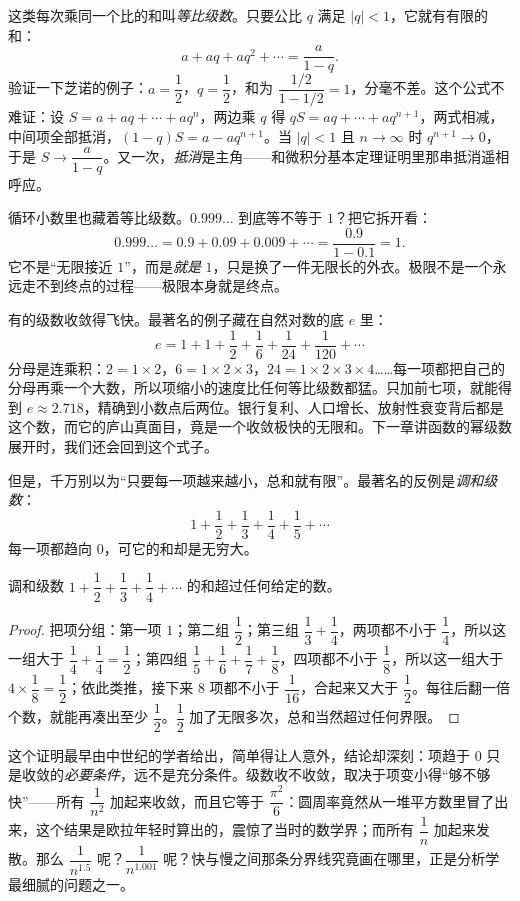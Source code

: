 这类每次乘同一个比的和叫\emph{等比级数}。只要公比 $q$ 满足 $|q|<1$，它就有有限的和：
\[
a+aq+aq^{2}+\cdots=\frac{a}{1-q}.
\]
验证一下芝诺的例子：$a=\dfrac12$，$q=\dfrac12$，和为 $\dfrac{1/2}{1-1/2}=1$，分毫不差。这个公式不难证：设 $S=a+aq+\cdots+aq^{n}$，两边乘 $q$ 得 $qS=aq+\cdots+aq^{n+1}$，两式相减，中间项全部抵消，$(1-q)S=a-aq^{n+1}$。当 $|q|<1$ 且 $n\to\infty$ 时 $q^{n+1}\to 0$，于是 $S\to\dfrac{a}{1-q}$。又一次，\emph{抵消}是主角——和微积分基本定理证明里那串抵消遥相呼应。

循环小数里也藏着等比级数。$0.999\ldots$ 到底等不等于 $1$？把它拆开看：
\[
0.999\ldots=0.9+0.09+0.009+\cdots=\frac{0.9}{1-0.1}=1 .
\]
它不是“无限接近 $1$”，而是\emph{就是} $1$，只是换了一件无限长的外衣。极限不是一个永远走不到终点的过程——极限本身就是终点。

有的级数收敛得飞快。最著名的例子藏在自然对数的底 $e$ 里：
\[
e=1+1+\frac12+\frac16+\frac1{24}+\frac1{120}+\cdots
\]
分母是连乘积：$2=1\times2$，$6=1\times2\times3$，$24=1\times2\times3\times4$……每一项都把自己的分母再乘一个大数，所以项缩小的速度比任何等比级数都猛。只加前七项，就能得到 $e\approx2.718$，精确到小数点后两位。银行复利、人口增长、放射性衰变背后都是这个数，而它的庐山真面目，竟是一个收敛极快的无限和。下一章讲函数的幂级数展开时，我们还会回到这个式子。

但是，千万别以为“只要每一项越来越小，总和就有限”。最著名的反例是\emph{调和级数}：
\[
1+\frac12+\frac13+\frac14+\frac15+\cdots
\]
每一项都趋向 $0$，可它的和却是无穷大。

\begin{dingli}[调和级数发散]
调和级数 $1+\dfrac12+\dfrac13+\dfrac14+\cdots$ 的和超过任何给定的数。
\end{dingli}

\begin{proof}
把项分组：第一项 $1$；第二组 $\dfrac12$；第三组 $\dfrac13+\dfrac14$，两项都不小于 $\dfrac14$，所以这一组大于 $\dfrac14+\dfrac14=\dfrac12$；第四组 $\dfrac15+\dfrac16+\dfrac17+\dfrac18$，四项都不小于 $\dfrac18$，所以这一组大于 $4\times\dfrac18=\dfrac12$；依此类推，接下来 $8$ 项都不小于 $\dfrac1{16}$，合起来又大于 $\dfrac12$。每往后翻一倍个数，就能再凑出至少 $\dfrac12$。$\dfrac12$ 加了无限多次，总和当然超过任何界限。
\end{proof}

这个证明最早由中世纪的学者给出，简单得让人意外，结论却深刻：项趋于 $0$ 只是收敛的\emph{必要条件}，远不是充分条件。级数收不收敛，取决于项变小得“够不够快”——所有 $\dfrac1{n^{2}}$ 加起来收敛，而且它等于 $\dfrac{\pi^{2}}{6}$：圆周率竟然从一堆平方数里冒了出来，这个结果是欧拉年轻时算出的，震惊了当时的数学界；而所有 $\dfrac1n$ 加起来发散。那么 $\dfrac1{n^{1.5}}$ 呢？$\dfrac1{n^{1.001}}$ 呢？快与慢之间那条分界线究竟画在哪里，正是分析学最细腻的问题之一。

